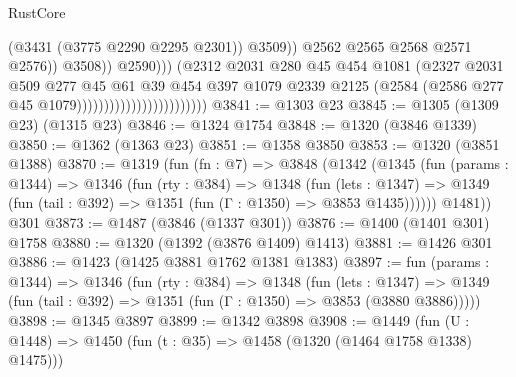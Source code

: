 \begin{lexlean}{RustCore}
\begin{coremodule}
                                                              (@3431 (@3775 @2290 @2295 @2301))
                                                              @3509))
                                                          @2562
                                                          @2565
                                                          @2568
                                                          @2571
                                                          @2576))
                                                      @3508))
                                                  @2590)))
                                            (@2312
                                              @2031
                                              @280
                                              @45
                                              @454
                                              @1081
                                              (@2327
                                                @2031
                                                @509
                                                @277
                                                @45
                                                @61
                                                @39
                                                @454
                                                @397
                                                @1079
                                                @2339
                                                @2125
                                                (@2584 (@2586 @277 @45 @1079))))))))))))))))))))))))
@3841 := @1303 @23
@3845 := @1305 (@1309 @23) (@1315 @23)
@3846 := @1324 @1754
@3848 := @1320 (@3846 @1339)
@3850 := @1362 (@1363 @23)
@3851 := @1358 @3850
@3853 := @1320 (@3851 @1388)
@3870 := @1319
    (fun (fn : @7) =>
    @3848
      (@1342
        (@1345
          (fun (params : @1344) =>
          @1346
            (fun (rty : @384) =>
            @1348
              (fun (lets : @1347) =>
              @1349 (fun (tail : @392) => @1351 (fun (Γ : @1350) => @3853 @1435))))))
        @1481))
    @301
@3873 := @1487 (@3846 (@1337 @301))
@3876 := @1400 (@1401 @301) @1758
@3880 := @1320 (@1392 (@3876 @1409) @1413)
@3881 := @1426 @301
@3886 := @1423 (@1425 @3881 @1762 @1381 @1383)
@3897 := fun (params : @1344) =>
  @1346
    (fun (rty : @384) =>
    @1348
      (fun (lets : @1347) =>
      @1349 (fun (tail : @392) => @1351 (fun (Γ : @1350) => @3853 (@3880 @3886)))))
@3898 := @1345 @3897
@3899 := @1342 @3898
@3908 := @1449 (fun (U : @1448) => @1450 (fun (t : @35) => @1458 (@1320 (@1464 @1758 @1338) @1475)))

\end{coremodule}
\end{lexlean}
